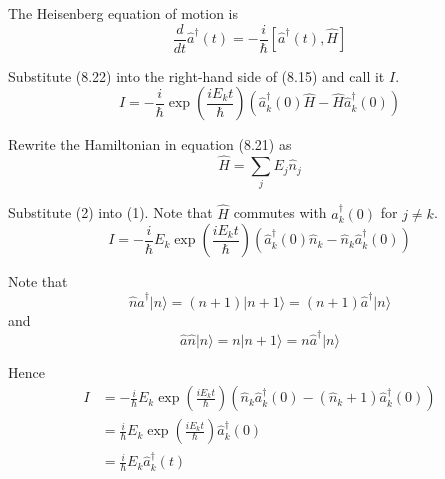 


\bigskip
The Heisenberg equation of motion is
\begin{equation*}
\frac{d}{dt}\hat a^\dag(t)=-\frac{i}{\hbar}\left[\hat a^\dag(t),\hat H\right]
\tag{8.15}
\end{equation*}

Substitute (8.22) into the right-hand side of (8.15) and call it $I$.
\begin{equation*}
I=-\frac{i}{\hbar}\exp\left(\frac{iE_kt}{\hbar}\right)
\left(\hat a_k^\dag(0)\hat H-\hat H\hat a_k^\dag(0)\right)
\tag{1}
\end{equation*}

Rewrite the Hamiltonian in equation (8.21) as
\begin{equation*}
\hat H=\sum_jE_j\hat n_j
\tag{2}
\end{equation*}

Substitute (2) into (1). Note that $\hat H$ commutes with $\hat a_k^\dag(0)$ for $j\ne k$.
\begin{equation*}
I=-\frac{i}{\hbar}E_k\exp\left(\frac{iE_kt}{\hbar}\right)
\left(\hat a_k^\dag(0)\hat n_k-\hat n_k\hat a_k^\dag(0)\right)
\end{equation*}

Note that
\begin{equation*}
\hat n\hat a^\dag|n\rangle=(n+1)|n+1\rangle=(n+1)\hat a^\dag|n\rangle
\end{equation*}
and
\begin{equation*}
\hat a\hat n|n\rangle=n|n+1\rangle=n\hat a^\dag|n\rangle
\end{equation*}

Hence
\begin{align*}
I&=-\frac{i}{\hbar}E_k\exp\left(\frac{iE_kt}{\hbar}\right)
\left(\hat n_k\hat a_k^\dag(0)-(\hat n_k+1)\hat a_k^\dag(0)\right)
\\
&=\frac{i}{\hbar}E_k\exp\left(\frac{iE_kt}{\hbar}\right)\hat a_k^\dag(0)
\\
&=\frac{i}{\hbar}E_k\hat a_k^\dag(t)
\tag{3}
\end{align*}

